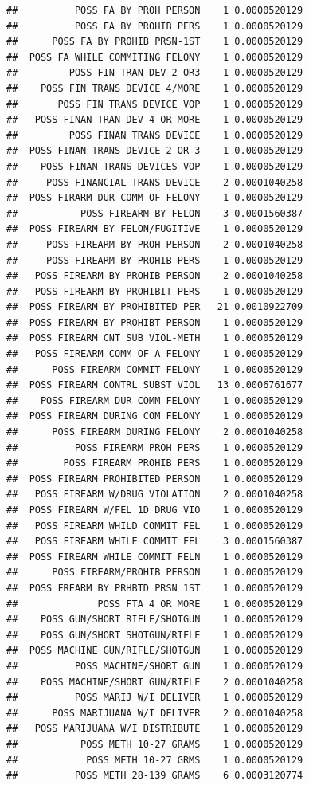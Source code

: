 \documentclass[]{book}
\begin{document}
\begin{verbatim}
##          POSS FA BY PROH PERSON    1 0.0000520129
##          POSS FA BY PROHIB PERS    1 0.0000520129
##      POSS FA BY PROHIB PRSN-1ST    1 0.0000520129
##  POSS FA WHILE COMMITING FELONY    1 0.0000520129
##         POSS FIN TRAN DEV 2 OR3    1 0.0000520129
##    POSS FIN TRANS DEVICE 4/MORE    1 0.0000520129
##       POSS FIN TRANS DEVICE VOP    1 0.0000520129
##   POSS FINAN TRAN DEV 4 OR MORE    1 0.0000520129
##         POSS FINAN TRANS DEVICE    1 0.0000520129
##  POSS FINAN TRANS DEVICE 2 OR 3    1 0.0000520129
##    POSS FINAN TRANS DEVICES-VOP    1 0.0000520129
##     POSS FINANCIAL TRANS DEVICE    2 0.0001040258
##  POSS FIRARM DUR COMM OF FELONY    1 0.0000520129
##           POSS FIREARM BY FELON    3 0.0001560387
##  POSS FIREARM BY FELON/FUGITIVE    1 0.0000520129
##     POSS FIREARM BY PROH PERSON    2 0.0001040258
##     POSS FIREARM BY PROHIB PERS    1 0.0000520129
##   POSS FIREARM BY PROHIB PERSON    2 0.0001040258
##   POSS FIREARM BY PROHIBIT PERS    1 0.0000520129
##  POSS FIREARM BY PROHIBITED PER   21 0.0010922709
##  POSS FIREARM BY PROHIBT PERSON    1 0.0000520129
##  POSS FIREARM CNT SUB VIOL-METH    1 0.0000520129
##   POSS FIREARM COMM OF A FELONY    1 0.0000520129
##      POSS FIREARM COMMIT FELONY    1 0.0000520129
##  POSS FIREARM CONTRL SUBST VIOL   13 0.0006761677
##    POSS FIREARM DUR COMM FELONY    1 0.0000520129
##  POSS FIREARM DURING COM FELONY    1 0.0000520129
##      POSS FIREARM DURING FELONY    2 0.0001040258
##          POSS FIREARM PROH PERS    1 0.0000520129
##        POSS FIREARM PROHIB PERS    1 0.0000520129
##  POSS FIREARM PROHIBITED PERSON    1 0.0000520129
##   POSS FIREARM W/DRUG VIOLATION    2 0.0001040258
##  POSS FIREARM W/FEL 1D DRUG VIO    1 0.0000520129
##   POSS FIREARM WHILD COMMIT FEL    1 0.0000520129
##   POSS FIREARM WHILE COMMIT FEL    3 0.0001560387
##  POSS FIREARM WHILE COMMIT FELN    1 0.0000520129
##      POSS FIREARM/PROHIB PERSON    1 0.0000520129
##  POSS FREARM BY PRHBTD PRSN 1ST    1 0.0000520129
##              POSS FTA 4 OR MORE    1 0.0000520129
##    POSS GUN/SHORT RIFLE/SHOTGUN    1 0.0000520129
##    POSS GUN/SHORT SHOTGUN/RIFLE    1 0.0000520129
##  POSS MACHINE GUN/RIFLE/SHOTGUN    1 0.0000520129
##          POSS MACHINE/SHORT GUN    1 0.0000520129
##    POSS MACHINE/SHORT GUN/RIFLE    2 0.0001040258
##          POSS MARIJ W/I DELIVER    1 0.0000520129
##      POSS MARIJUANA W/I DELIVER    2 0.0001040258
##   POSS MARIJUANA W/I DISTRIBUTE    1 0.0000520129
##           POSS METH 10-27 GRAMS    1 0.0000520129
##            POSS METH 10-27 GRMS    1 0.0000520129
##          POSS METH 28-139 GRAMS    6 0.0003120774

\end{verbatim}
\end{document}
